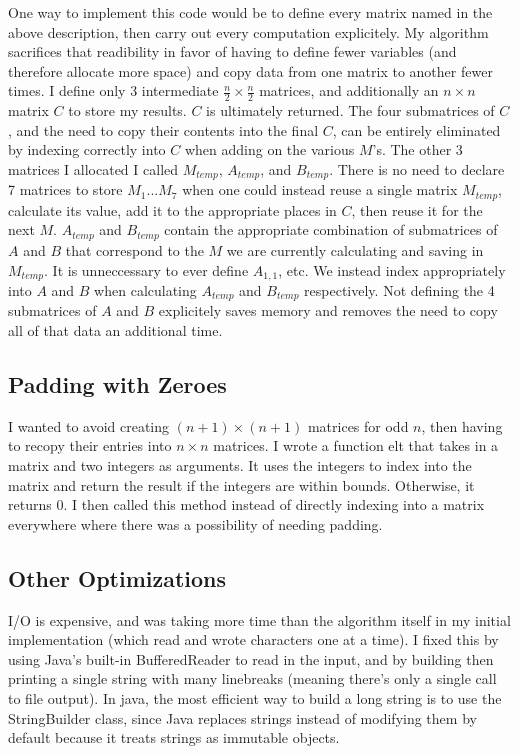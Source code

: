 \documentclass{article}
\begin{document}
One way to implement this code would be to define every matrix named in the above description, then carry out every computation explicitely. My algorithm sacrifices that readibility in favor of having to define fewer variables (and therefore allocate more space) and copy data from one matrix to another fewer times. I define only 3 intermediate $\frac{n}{2} \times \frac{n}{2}$ matrices, and additionally an $n \times n$ matrix $C$ to store my results. $C$ is ultimately returned. The four submatrices of $C$, and the need to copy their contents into the final $C$, can be entirely eliminated by indexing correctly into $C$ when adding on the various $M$'s.  The other 3 matrices I allocated I called $M_{temp}$, $A_{temp}$, and $B_{temp}$. There is no need to declare 7 matrices to store $M_1 ... M_7$ when one could instead reuse a single matrix $M_{temp}$, calculate its value, add it to the appropriate places in $C$, then reuse it for the next $M$. $A_{temp}$ and $B_{temp}$ contain the appropriate combination of submatrices of $A$ and $B$ that correspond to the $M$ we are currently calculating and saving in $M_{temp}$. It is unneccessary to ever define $A_{1, 1}$, etc. We instead index appropriately into $A$ and $B$ when calculating $A_{temp}$ and $B_{temp}$ respectively. Not defining the 4 submatrices of $A$ and $B$ explicitely saves memory and removes the need to copy all of that data an additional time. 

\subsection*{Padding with Zeroes}
I wanted to avoid creating $(n+1) \times (n+1)$ matrices for odd $n$, then having to recopy their entries into $n \times n$ matrices. I wrote a function elt that takes in a matrix and two integers as arguments. It uses the integers to index into the matrix and return the result if the integers are within bounds. Otherwise, it returns 0. I then called this method instead of directly indexing into a matrix everywhere where there was a possibility of needing padding. 

\subsection*{Other Optimizations}
I/O is expensive, and was taking more time than the algorithm itself in my initial implementation (which read and wrote characters one at a time). I fixed this by using Java's built-in BufferedReader to read in the input, and by building then printing a single string with many linebreaks (meaning there's only a single call to file output). In java, the most efficient way to build a long string is to use the StringBuilder class, since Java replaces strings instead of modifying them by default because it treats strings as immutable objects. 
\end{document}

